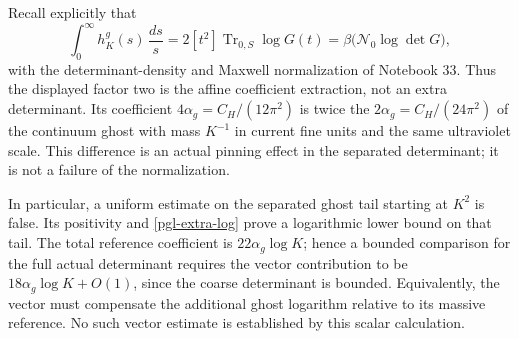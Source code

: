 Recall explicitly that
\[
 \int_0^\infty h_K^g(s)\,\frac{ds}{s}
   =2[t^2]\operatorname{Tr}_{0,S}\log G(t)
   =\beta\bigl(\mathcal N_0\log\det G\bigr),
\]
with the determinant-density and Maxwell normalization
of Notebook 33. Thus the displayed factor two is the
affine coefficient extraction, not an extra determinant.
Its coefficient \(4\alpha_g=C_H/(12\pi^2)\) is
twice the \(2\alpha_g=C_H/(24\pi^2)\) of the
continuum ghost with mass \(K^{-1}\) in current
fine units and the same ultraviolet scale.
This difference is an actual pinning effect in the
separated determinant; it is not a failure of the
normalization.

In particular, a uniform estimate on the separated
ghost tail starting at \(K^2\) is false. Its positivity
and \eqref{pgl-extra-log} prove a logarithmic lower
bound on that tail. The total reference coefficient
is \(22\alpha_g\log K\); hence a bounded comparison
for the full actual determinant requires the vector
contribution to be \(18\alpha_g\log K+O(1)\), since
the coarse determinant is bounded. Equivalently,
the vector must compensate the additional ghost
logarithm relative to its massive reference.
No such vector estimate is established by this
scalar calculation.
